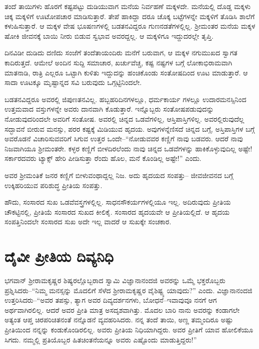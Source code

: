 ತಂದೆ ತಾಯಿಗಳು ಹೊರಗೆ ಕಷ್ಟಪಟ್ಟು ದುಡಿಯುವಾಗ ಮನೆಯ ನಿರ್ವಹಣೆ ಮಕ್ಕಳದೇ. ಮನೆಯಲ್ಲಿ ದೊಡ್ಡ ಮಕ್ಕಳು ಚಿಕ್ಕ ಮಕ್ಕಳಿಗೆ ಊಟೋಪಚಾರ ಮಾಡಿಸುತ್ತಾರೆ. ತೇಪೆ ಹಾಕಿದ್ದಾ ದರೂ ಚೊಕ್ಕ ಬಟ್ಟೆಗಳನ್ನೇ ಮಕ್ಕಳಿಗೆ ತೊಡಿಸಿ ಶಾಲೆಗೆ ಕಳುಹಿಸುತ್ತಾರೆ. ಆ ಮಕ್ಕಳ ವೇಷ ಭೂಷಣಗಳಲ್ಲಿ ಬಡತನವಿದ್ದರೂ ಗುಣನಡತೆಗಳಲ್ಲಿಲ್ಲ. ಶ‍್ರೀಮಂತರ ಮನೆಯ ಮಕ್ಕಳ ಷೋಕಿ ಜೀವನಕ್ಕೆ ಬಾಯಿ ನೀರು ಬಿಡುವ ಸ್ವಭಾವ ಅವರದ್ದಲ್ಲ. ಆ ಮಕ್ಕಳಿಗೂ ಇದ್ದುದರಲ್ಲೇ ತೃಪ್ತಿ.

ದಿನವಿಡೀ ದುಡಿದು ದಣಿದು ಸಂಜೆಗೆ ತಂದೆತಾಯಂದಿರು ಮನೆಗೆ ಬರುವಾಗ, ಆ ಮಕ್ಕಳ ನಗುಮುಖದ ಸ್ವಾಗತ ಕಾದಿರುತ್ತದೆ. ಆಮೇಲೆ ಅಂದಿನ ಸುದ್ದಿ ಸಮಾಚಾರ, ಖರ್ಚುವೆಚ್ಚ, ಕಷ್ಟ ನಷ್ಟಗಳ ಬಗ್ಗೆ ಲೋಕಾಭಿರಾಮವಾಗಿ ಮಾತನಾಡಿ, ರಾತ್ರಿ ಎಲ್ಲರೂ ಒಟ್ಟಾಗಿ ಕುಳಿತು ಇದ್ದುದನ್ನು ಹಂಚಿಕೊಂಡು ಸಂತೋಷದಿಂದ ಊಟ ಮಾಡುತ್ತಾರೆ. ಆ ಸಾದಾ ಊಟಕ್ಕೂ ಮೃಷ್ಟಾನ್ನದ ಸವಿ ಬರುವುದು ಒಗ್ಗಟ್ಟಿನಿಂದಲೇ.

ಬಡತನವಿದ್ದರೂ ಅವರಲ್ಲಿ ಜಿಪುಣತನವಿಲ್ಲ. ಹಬ್ಬಹರಿದಿನಗಳಲ್ಲೂ, ಧರ್ಮಕಾರ್ಯ ಗಳಲ್ಲೂ ಉದಾರಮನಸ್ಸಿನಿಂದ ಉತ್ತಮವಾದ ವಸ್ತುಗಳನ್ನೇ ಅವರು ದಾನವಾಗಿ ಕೊಡುತ್ತಾರೆ. ಇನ್ನೊಬ್ಬರು ಸಂತೋಷಪಡುವುದನ್ನು ನೋಡುವುದರಿಂದಲೇ ಅವರಿಗೆ ಸಂತೋಷ. ಅವರಲ್ಲಿ ಚಿನ್ನದ ಒಡವೆಗಳಿಲ್ಲ, ಆಸ್ತಿಪಾಸ್ತಿಗಳಿಲ್ಲ. ಅವರಲ್ಲಿರುವುದೆಲ್ಲ ಸದ್ಭಾವನೆ ಬೀರುವ ಮನಸ್ಸು, ಪರರ ಕಷ್ಟಕ್ಕೆ ಮಿಡಿಯುವ ಹೃದಯ. ಅವುಗಳನ್ನೆಣಿಸದೆ ಚಿನ್ನದ ಬಗ್ಗೆ, ಅಸ್ತಿಪಾಸ್ತಿಗಳ ಬಗ್ಗೆ ಅವರೊಡನೆ ವಿಚಾರಿಸುವವರಿಗೆ ಸಿಗುವ ಉತ್ತರ ಒಂದೇ–“ನೋಡುವವರ ಕಣ್ಣಿಗೆ ನಾವು ಬಡವರು. ಆದರೆ ನಾವು ನಿಜವಾಗಿಯೂ ಶ‍್ರೀಮಂತರೇ. ಕಳ್ಳರ ಕಣ್ಣಿಗೆ ಬೀಳದಿರಲೆಂದು ನಾವು ಚಿನ್ನದ ಒಡವೆಗಳನ್ನು ಹಾಕಿಕೊಳ್ಳುವುದಿಲ್ಲ ಅಷ್ಟೇ! ಸರ್ಕಾರದವರು ಟ್ಯಾಕ್ಸ್ ಹೇರಿ ಪೀಡಿಸುತ್ತಾ ರೆಂದು ಹೊಲ, ಮನೆ ಕೊಂಡಿಲ್ಲ ಅಷ್ಟೇ!” ಎಂದು.

ಅವರ ಶ‍್ರೀಮಂತಿಕೆ ಜನರ ಕಣ್ಣಿಗೆ ಬೀಳುವಂಥಾದ್ದಲ್ಲ ನಿಜ. ಅದು ಹೃದಯದ ಸಂಪತ್ತು– ಜೀವಜೀವನದ ಬಗ್ಗೆ ಉಕ್ಕಿಹರಿಯುವ ಪರಿಶುದ್ಧ ಪ್ರೀತಿಯ ಸಂಪತ್ತು.

ಹೌದು, ಸಂಸಾರದ ಸುಖ ಒಡವೆವಸ್ತ್ರಗಳಲ್ಲಿಲ್ಲ. ಸಾಧನಸೌಕರ್ಯಗಳಲ್ಲಿಯೂ ಇಲ್ಲ. ಅದಿರುವುದು ಪ್ರೀತಿಯ ಚೌಕಟ್ಟಿನಲ್ಲಿ, ಪ್ರೀತಿಯೆ ಸಂಸಾರದ ಸುಖದ ಕೀಲಿಕೈ. ಸಂಸಾರದ ಹೃದಯವೇ ಆ ಪ್ರೀತಿಯಲ್ಲಿದೆ. ಆ ಹೃದಯ ಸಂಪತ್ತಿನಿಂದಲೇ ಸಂಸಾರದ ಸುಖ ಅದೇ ಇಲ್ಲ ವಾದರೆ ಆ ಸುಖಕ್ಕೇ ಸಂಚಕಾರ.


\section{ದೈವೀ ಪ್ರೀತಿಯ ದಿವ್ಯನಿಧಿ}

ಭಗವಾನ್ ಶ‍್ರೀರಾಮಕೃಷ್ಣರ ಶಿಷ್ಯರಲ್ಲೊಬ್ಬರಾದ ಸ್ವಾಮಿ ವಿಜ್ಞಾನಾನಂದಜಿ ಅವರನ್ನು ಒಮ್ಮೆ ಭಕ್ತರೊಬ್ಬರು ಪ್ರಶ್ನಿಸಿದರು–“ನಿಮ್ಮ ಮನಸ್ಸನ್ನು ಮೊದಲಿಗೆ ಸೆಳೆದ ಶ‍್ರೀರಾಮಕೃಷ್ಣರ ವೈಶಿಷ್ಟ್ಯ ಯಾವುದು?” ಎಂದು. ವಿಜ್ಞಾನಾನಂದಜಿ ಉತ್ತರಿಸಿದರು–“ಅವರ ತಪಸ್ಸು, ತ್ಯಾಗ ಅವರ ದಿವ್ಯದರ್ಶನಗಳು, ಬೋಧನೆ–ಇವಾವುವೂ ನನಗೆ ಆಗ ಅರ್ಥವಾಗಿರಲಿಲ್ಲ. ಆದರೆ ಅವರ ಪ್ರೀತಿ ಮಾತ್ರ ಅಸದೃಶವಾಗಿತ್ತು. ಮೊದಲ ಬಾರಿ ನಾನು ಅವರನ್ನು ಕಂಡಾಗಲೇ ಅತ್ಯಂತ ಆಪ್ತ ಚಿರಪರಿಚಿತನಂತೆ ನನ್ನೊಡನೆ ವ್ಯವಹರಿಸಿದರು. ನನ್ನ ತಂದೆ ತಾಯಿ, ಅಣ್ಣ ತಮ್ಮಂದಿರೂ ಅಷ್ಟು ಪ್ರೀತಿಯಿಂದ ನನ್ನನ್ನು ಕಂಡುಕೊಂಡಿರಲಿಲ್ಲ. ಅವರು ಪ್ರೀತಿಯ ನಿಧಿಯಾಗಿದ್ದರು. ಅವರ ಪ್ರೀತಿಗೆ ಯಾವ ಹೋಲಿಕೆಯೂ ಸಿಗದು. ನಮ್ಮಲ್ಲಿ ಪ್ರತಿಯೊಬ್ಬರ ಹಿತಚಿಂತನೆಯನ್ನೂ ಅವರು ಎಷ್ಟೊಂದು ಮಾಡುತ್ತಿದ್ದರು!”

